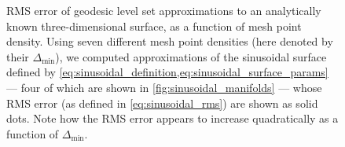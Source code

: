 \begin{figure}[htpb]
    \centering
    \caption[RMS error of geodesic level set approximations to an analytically
    known three-dimensional surface, as a function of mesh point density]
    {RMS error of geodesic level set approximations to an analytically known
    three-dimensional surface, as a function of mesh point density.
    Using seven different mesh point densities (here denoted by their
    $\Delta_{\min}$), we computed approximations of the sinusoidal surface
    defined by \cref{eq:sinusoidal_definition,eq:sinusoidal_surface_params} ---
    four of which are shown in \cref{fig:sinusoidal_manifolds} --- whose
    RMS error (as defined in \cref{eq:sinusoidal_rms}) are shown as solid
    dots. Note how the RMS error appears to increase quadratically
    as a function of $\Delta_{\min}$.
}
    \label{fig:sinusoidal_manifold_errors}
\end{figure}

